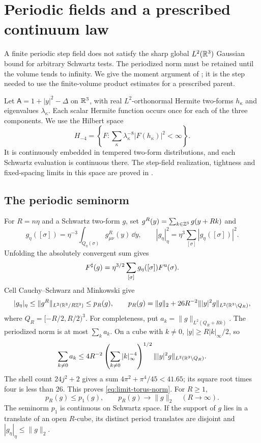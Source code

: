 \section{Periodic fields and a prescribed continuum law}
\label{sec:continuum-limits}

A finite periodic step field does not satisfy the sharp global
$L^2(\mathbb R^3)$ Gaussian bound for arbitrary Schwartz tests.
The periodized norm must be retained until the volume tends
to infinity. We give the moment argument of
\cite[\S6.1--6.2]{QED3Master}; it is the step needed to use the
finite-volume product estimates for a prescribed parent.

Let $\mathsf A=1+|y|^2-\Delta$ on $\mathbb R^3$, with real
$L^2$-orthonormal Hermite two-forms $h_\kappa$ and eigenvalues
$\lambda_\kappa$. Each scalar Hermite function occurs once
for each of the three components. We use the Hilbert space
\[
 H_{-4}=\left\{F:\sum_\kappa\lambda_\kappa^{-8}
                                  |F(h_\kappa)|^2<\infty\right\}.
\]
It is continuously embedded in tempered two-form distributions,
and each Schwartz evaluation is continuous there.
The step-field realization, tightness and fixed-spacing limits
in this space are proved in \cite{ContinuumExistence}.

\subsection{The periodic seminorm}

For $R=n\eta$ and a Schwartz two-form $g$, set
$g^R(y)=\sum_{k\in\mathbb Z^3}g(y+Rk)$ and
\[
 g_\eta([\sigma])=\eta^{-3}
                \int_{Q_\eta(\sigma)}g^R_{\mu\nu}(y)\,\dd y,
 \qquad |g_\eta|_\eta^2=\eta^3\sum_{[\sigma]}|g_\eta([\sigma])|^2.
\]
Unfolding the absolutely convergent sum gives
\begin{equation}\label{eq:limit-step-pairing}
 F^\sharp(g)=\eta^{3/2}\sum_{[\sigma]}
                         g_\eta([\sigma])F^{\rm u}(\sigma).
\end{equation}
Cell Cauchy--Schwarz and Minkowski give
\begin{equation}\label{eq:limit-torus-norm}
 |g_\eta|_\eta\le\|g^R\|_{L^2(\mathbb R^3/R\mathbb Z^3)}\le p_R(g),
 \qquad
 p_R(g)=\|g\|_2+
      26R^{-2}\||y|^2g\|_{L^2(\mathbb R^3\setminus Q_R)},
\end{equation}
where $Q_R=[-R/2,R/2)^3$.
For completeness, put $a_k=\|g\|_{L^2(Q_R+Rk)}$.
The periodized norm is at most $\sum_ka_k$. On a cube with
$k\ne0$, $|y|\ge R|k|_\infty/2$, so
\[
 \sum_{k\ne0}a_k
 \le4R^{-2}\left(\sum_{k\ne0}|k|_\infty^{-4}\right)^{1/2}
                 \||y|^2g\|_{L^2(\mathbb R^3\setminus Q_R)}.
\]
The shell count $24j^2+2$ gives a sum
$4\pi^2+\pi^4/45<41.65$; its square root times four is
less than $26$. This proves \eqref{eq:limit-torus-norm}.
For $R\ge1$,
\[
 p_R(g)\le p_1(g),\qquad p_R(g)\longrightarrow\|g\|_2
                      \quad(R\longrightarrow\infty).
\]
The seminorm $p_1$ is continuous on Schwartz space.
If the support of $g$ lies in a translate of an open
$R$-cube, its distinct period translates are disjoint and
$|g_\eta|_\eta\le\|g\|_2$.

